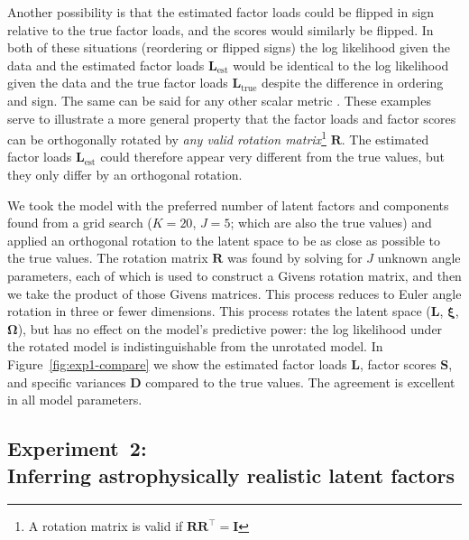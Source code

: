 \documentclass[twocolumn]{aastex62}
\newcommand{\vect}[1]{\boldsymbol{\mathbf{#1}}}
\renewcommand{\vec}[1]{\vect{#1}}
\newcommand{\transpose}{^\intercal}
\newcommand{\factorloads}{\textbf{L}}
\newcommand{\factorscores}{\textbf{S}}
\newcommand{\specificvariance}{\vec{D}}
\newcommand{\scoremeans}{\vec\xi}
\newcommand{\scorecovs}{\vec\Omega}
\newcommand{\NumLatentFactors}{J}
\newcommand{\NumComponents}{K}
\begin{document}
Another possibility is that the estimated factor loads could be flipped in sign 
relative to the true factor loads, and the scores would similarly be flipped. 
In both of these situations (reordering or flipped signs) the log likelihood 
given the data and the estimated factor loads $\factorloads_\textrm{est}$ 
would be identical to the log likelihood given the data and the true factor loads 
$\factorloads_\textrm{true}$
despite the difference in ordering and sign. The same can be said for any other
scalar metric \citep[e.g., Kullback-Leibler divergence;][]{Kullback:1951}.
These examples serve to illustrate a more 
general property that the factor loads and factor scores can be orthogonally 
rotated by \emph{any valid rotation matrix}\footnote{A rotation matrix is valid if 
$\vec{R}\vec{R}\transpose = \vec{I}$} $\vec{R}$. The estimated factor loads 
$\factorloads_\textrm{est}$ could therefore appear very different from the true 
values, but they only differ by an orthogonal rotation. 




We took the model with the preferred number of latent factors and components found
from a grid search ($\NumComponents = 20$, $\NumLatentFactors = 5$; which are also
the true values) and applied an orthogonal rotation to the latent space to be as
close as possible to the true values. The rotation matrix $\mathbf{R}$ was found
by solving for $\NumLatentFactors$ unknown angle parameters, each of which is used
to construct a Givens rotation matrix, and then we take the product of those Givens
matrices. This process reduces to Euler angle rotation in three or fewer dimensions.
This process rotates the latent space
($\factorloads$, $\scoremeans$, $\scorecovs$), but has no effect on the model's 
predictive power: the log likelihood \citep[or the Kullback-Leibler divergence;][]{Kullback:1951} under the
rotated model is indistinguishable from the unrotated model.
In Figure~\ref{fig:exp1-compare} we show the estimated factor loads $\factorloads$,
factor scores $\factorscores$, and specific variances $\specificvariance$ compared
to the true values. The agreement is excellent in all model parameters. 

 


\subsection{Experiment~2:\\Inferring astrophysically realistic latent factors}
\end{document}
